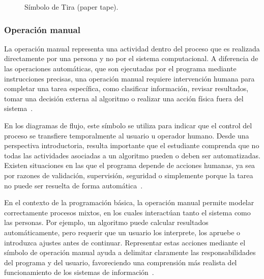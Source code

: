 \documentclass[12pt,twoside]{book}
\begin{document}
						\begin{figure}[h]
							\centering
							\caption{Símbolo de Tira (paper tape).}
							\label{fig:DFTira}
						\end{figure}
						
					\subsubsection{Operación manual}
						La operación manual representa una actividad dentro del proceso que es realizada directamente por una persona y no por el sistema computacional. A diferencia de las operaciones automáticas, que son ejecutadas por el programa mediante instrucciones precisas, una operación manual requiere intervención humana para completar una tarea específica, como clasificar información, revisar resultados, tomar una decisión externa al algoritmo o realizar una acción física fuera del sistema~\cite{Joyanes2007Fundamentos,Manzano2017Programacion}.
						
						En los diagramas de flujo, este símbolo se utiliza para indicar que el control del proceso se transfiere temporalmente al usuario u operador humano. Desde una perspectiva introductoria, resulta importante que el estudiante comprenda que no todas las actividades asociadas a un algoritmo pueden o deben ser automatizadas. Existen situaciones en las que el programa depende de acciones humanas, ya sea por razones de validación, supervisión, seguridad o simplemente porque la tarea no puede ser resuelta de forma automática~\cite{Kendall2014Systems}.
						
						En el contexto de la programación básica, la operación manual permite modelar correctamente procesos mixtos, en los cuales interactúan tanto el sistema como las personas. Por ejemplo, un algoritmo puede calcular resultados automáticamente, pero requerir que un usuario los interprete, los apruebe o introduzca ajustes antes de continuar. Representar estas acciones mediante el símbolo de operación manual ayuda a delimitar claramente las responsabilidades del programa y del usuario, favoreciendo una comprensión más realista del funcionamiento de los sistemas de información~\cite{Joyanes2007Fundamentos,SmartDrawFlowchartSymbols}.
						
\end{document}
